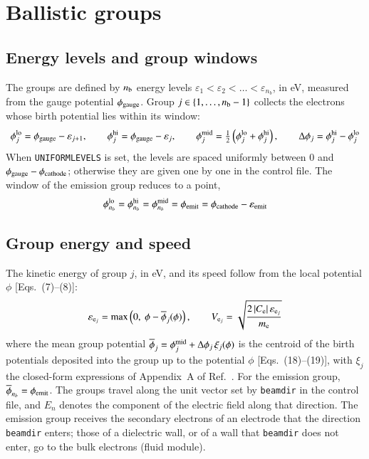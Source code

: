 \documentclass{warpdoc}
\begin{document}
\section{Ballistic groups}

\subsection{Energy levels and group windows}

The groups are defined by $n_{\rm b}$ energy levels $\varepsilon_1 < \varepsilon_2 < \dots < \varepsilon_{n_b}$, in eV, measured from the gauge potential $\phi_{\rm gauge}$. Group $j\in\{1,\dots,n_{\rm b}-1\}$ collects the electrons whose birth potential lies within its window:
$$
\phi^{\rm lo}_j=\phi_{\rm gauge}-\varepsilon_{j+1},\qquad
\phi^{\rm hi}_j=\phi_{\rm gauge}-\varepsilon_{j},\qquad
\phi^{\rm mid}_j=\tfrac{1}{2}\left(\phi^{\rm lo}_j+\phi^{\rm hi}_j\right),\qquad
\Delta\phi_j=\phi^{\rm hi}_j-\phi^{\rm lo}_j
$$
When {\tt UNIFORMLEVELS} is set, the levels are spaced uniformly between 0 and $\phi_{\rm gauge}-\phi_{\rm cathode}$; otherwise they are given one by one in the control file. The window of the emission group reduces to a point,
$$
\phi^{\rm lo}_{n_b}=\phi^{\rm hi}_{n_b}=\phi^{\rm mid}_{n_b}=\phi_{\rm emit}=\phi_{\rm cathode}-\varepsilon_{\rm emit}
$$

\subsection{Group energy and speed}

The kinetic energy of group $j$, in eV, and its speed follow from the local potential $\phi$ [Eqs.~(7)--(8)]:
$$
\varepsilon_{{\rm e}_j}=\max\left(0,\ \phi-\overline{\phi}_j(\phi)\right),\qquad
V_{{\rm e}_j}=\sqrt{\frac{2\,|C_{\rm e}|\,\varepsilon_{{\rm e}_j}}{m_{\rm e}}}
$$
where the mean group potential $\overline{\phi}_j=\phi^{\rm mid}_j+\Delta\phi_j\,\xi_j(\phi)$ is the centroid of the birth potentials deposited into the group up to the potential $\phi$ [Eqs.~(18)--(19)], with $\xi_j$ the closed-form expressions of Appendix~A of Ref.~\cite{arxiv:2026:parent}. For the emission group, $\overline{\phi}_{n_b}=\phi_{\rm emit}$. The groups travel along the unit vector set by {\tt beamdir} in the control file, and $E_n$ denotes the component of the electric field along that direction. The emission group receives the secondary electrons of an electrode that the direction {\tt beamdir} enters; those of a dielectric wall, or of a wall that {\tt beamdir} does not enter, go to the bulk electrons (fluid module).
\end{document}
